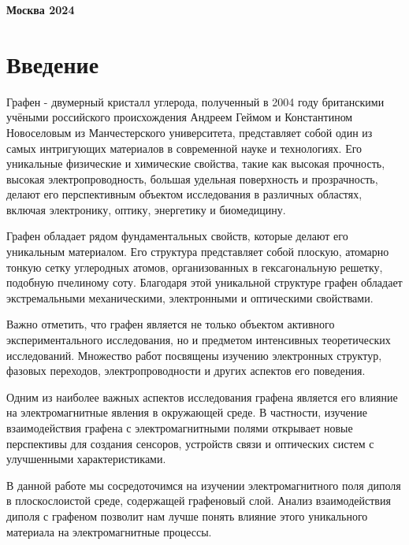 	\vspace{2em}
	
	\vspace{\fill}
	
	\begin{center}
		\textbf{{\large Москва 2024}}
	\end{center}
	\thispagestyle{empty} 
	
	
	\tableofcontents
	
	\newpage
	
	\section{Введение} 
	
	Графен - двумерный кристалл углерода, полученный в 2004 году британскими учёными российского происхождения Андреем Геймом и Константином Новоселовым из Манчестерского университета, представляет собой один из самых интригующих материалов в современной науке и технологиях. Его уникальные физические и химические свойства, такие как высокая прочность, высокая электропроводность, большая удельная поверхность и прозрачность, делают его перспективным объектом исследования в различных областях, включая электронику, оптику, энергетику и биомедицину.
	
	Графен обладает рядом фундаментальных свойств, которые делают его уникальным материалом. Его структура представляет собой плоскую, атомарно тонкую сетку углеродных атомов, организованных в гексагональную решетку, подобную пчелиному соту. Благодаря этой уникальной структуре графен обладает экстремальными механическими, электронными и оптическими свойствами.
	
	Важно отметить, что графен является не только объектом активного экспериментального исследования, но и предметом интенсивных теоретических исследований. Множество работ посвящены изучению электронных структур, фазовых переходов, электропроводности и других аспектов его поведения.
	
	Одним из наиболее важных аспектов исследования графена является его влияние на электромагнитные явления в окружающей среде. В частности, изучение взаимодействия графена с электромагнитными полями открывает новые перспективы для создания сенсоров, устройств связи и оптических систем с улучшенными характеристиками.
	
	В данной работе мы сосредоточимся на изучении электромагнитного поля диполя в плоскослоистой среде, содержащей графеновый слой. Анализ взаимодействия диполя с графеном позволит нам лучше понять влияние этого уникального материала на электромагнитные процессы.
	
